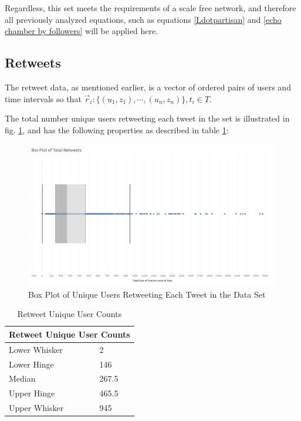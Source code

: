 \documentclass[NETN,manuscript]{stjour-new}
\begin{document}
Regardless, this set meets the requirements of a scale free network, and therefore all previously analyzed equations, such as equations \ref{Ldotpartisan} and \ref{echo chamber by followers} will be applied here.

\subsection{Retweets}
The retweet data, as mentioned earlier, is a vector of ordered pairs of users and time intervals so that $\vec{r}_i:\{(u_1,z_1), \cdots, (u_n,z_n)\}, t_i \in T$.

The total number unique users retweeting each tweet in the set is illustrated in fig. \ref{fig:Unique Retweeters}, and has the following properties as described in table \ref{Retweet Unique User Counts}:
\begin{figure}[h]
 \centering
  \includegraphics[width=12cm]{Retweet Box Plot.png}
  \caption{Box Plot of Unique Users Retweeting Each Tweet in the Data Set}\label{fig:Unique Retweeters}
 \end{figure}
 
\begin{table}[h]
\centering
\begin{tabular}{ |p{3cm}|p{3cm}|  }
\hline
\multicolumn{2}{|c|}{Retweet Unique User Counts} \\
\hline
Lower Whisker & 2\\
Lower Hinge & 146 \\
Median & 267.5 \\
Upper Hinge & 465.5 \\
Upper Whisker & 945 \\
\hline
\end{tabular}
\caption{Retweet Unique User Counts}
\label{Retweet Unique User Counts}
\end{table}
\end{document}
